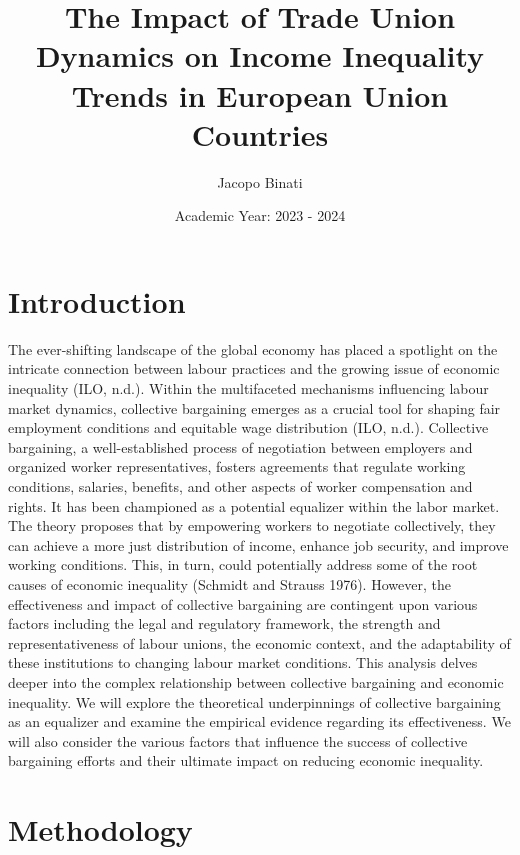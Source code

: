 \documentclass{article}
\begin{document}
\title{The Impact of Trade Union Dynamics on Income Inequality Trends in European Union Countries}
\author{Jacopo Binati}
\date{Academic Year: 2023 - 2024}
\maketitle
\section{Introduction}

The ever-shifting landscape of the global economy has placed a spotlight on the intricate connection between labour practices and the growing issue of economic inequality (ILO, n.d.). Within the multifaceted mechanisms influencing labour market dynamics, collective bargaining emerges as a crucial tool for shaping fair employment conditions and equitable wage distribution (ILO, n.d.). Collective bargaining, a well-established process of negotiation between employers and organized worker representatives, fosters agreements that regulate working conditions, salaries, benefits, and other aspects of worker compensation and rights. It has been championed as a potential equalizer within the labor market. The theory proposes that by empowering workers to negotiate collectively, they can achieve a more just distribution of income, enhance job security, and improve working conditions. This, in turn, could potentially address some of the root causes of economic inequality (Schmidt and Strauss 1976). However, the effectiveness and impact of collective bargaining are contingent upon various factors including the legal and regulatory framework, the strength and representativeness of labour unions, the economic context, and the adaptability of these institutions to changing labour market conditions. This analysis delves deeper into the complex relationship between collective bargaining and economic inequality. We will explore the theoretical underpinnings of collective bargaining as an equalizer and examine the empirical evidence regarding its effectiveness. We will also consider the various factors that influence the success of collective bargaining efforts and their ultimate impact on reducing economic inequality.

\section{Methodology}
\end{document}
